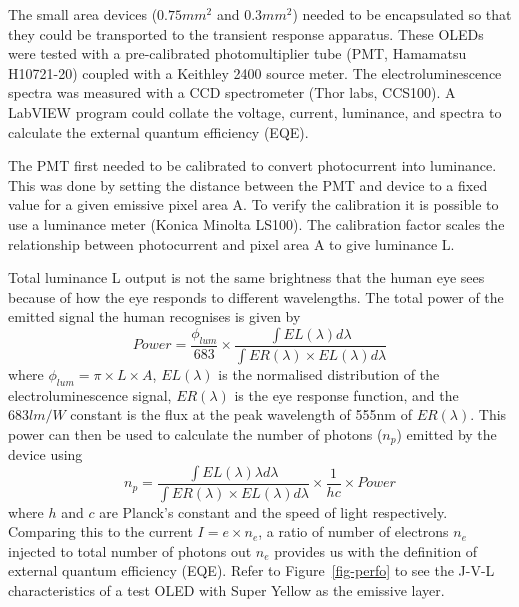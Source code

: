 \documentclass[
  letterpaper,
  DIV=11,
  numbers=noendperiod,
  oneside]{scrreprt}
\begin{document}
The small area devices (\(0.75mm^2\) and \(0.3mm^2\)) needed to be
encapsulated so that they could be transported to the transient response
apparatus. These OLEDs were tested with a pre-calibrated photomultiplier
tube (PMT, Hamamatsu H10721-20) coupled with a Keithley 2400 source
meter. The electroluminescence spectra was measured with a CCD
spectrometer (Thor labs, CCS100). A LabVIEW program could collate the
voltage, current, luminance, and spectra to calculate the external
quantum efficiency (EQE).

The PMT first needed to be calibrated to convert photocurrent into
luminance. This was done by setting the distance between the PMT and
device to a fixed value for a given emissive pixel area A. To verify the
calibration it is possible to use a luminance meter (Konica Minolta
LS100). The calibration factor scales the relationship between
photocurrent and pixel area A to give luminance L.

Total luminance L output is not the same brightness that the human eye
sees because of how the eye responds to different wavelengths. The total
power of the emitted signal the human recognises is given by
\[Power = \frac{\phi_{lum}}{683}\times \frac{\int EL(\lambda)d\lambda}{\int ER(\lambda)\times EL(\lambda)d\lambda}\]
where \(\phi_{lum} = \pi\times L \times A\), \(EL(\lambda)\) is the
normalised distribution of the electroluminescence signal,
\(ER(\lambda)\) is the eye response function, and the \(683 lm/W\)
constant is the flux at the peak wavelength of 555nm of \(ER(\lambda)\).
This power can then be used to calculate the number of photons (\(n_p\))
emitted by the device using
\[n_p = \frac{\int EL(\lambda)\lambda d\lambda}{\int ER(\lambda)\times EL(\lambda)d\lambda} \times \frac{1}{hc} \times Power\]
where \(h\) and \(c\) are Planck's constant and the speed of light
respectively. Comparing this to the current \(I=e\times n_e\), a ratio
of number of electrons \(n_e\) injected to total number of photons out
\(n_e\) provides us with the definition of external quantum efficiency
(EQE). Refer to Figure~\ref{fig-perfo} to see the J-V-L characteristics
of a test OLED with Super Yellow as the emissive layer.
\end{document}

